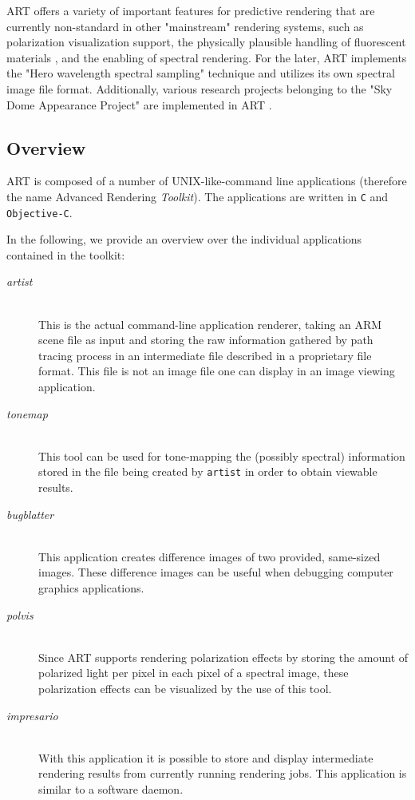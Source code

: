 ART offers a variety of important features for predictive rendering that are currently non-standard in other "mainstream" rendering systems, such as polarization visualization support, the physically plausible handling of fluorescent materials \cite{mojzik2018handling}, and the enabling of spectral rendering. For the later, ART implements the "Hero wavelength spectral sampling" technique \cite{wilkie2014hero} and utilizes its own spectral image file format. Additionally, various research projects belonging to the "Sky Dome Appearance Project" are implemented in ART \cite{hosek2012analytic, hovsek2013adding, wilkie2013predicting}.


\subsection{Overview}
ART	is composed of a number of UNIX-like-command line applications (therefore the name Advanced Rendering \emph{Toolkit}). The applications are written in \texttt{C} and \texttt{Objective-C}. 

In the following, we provide an overview over the individual applications contained in the toolkit:
\begin{description}
	\item[\emph{artist}] \hfil \\ This is the actual command-line application renderer, taking an ARM scene file as input and storing the raw information gathered by path tracing process in an intermediate file described in a proprietary file format. This file is not an image file one can display in an image viewing application.
	\item[\emph{tonemap}] \hfil \\ This tool can be used for tone-mapping the (possibly spectral) information stored in the file being created by \texttt{artist} in order to obtain viewable results.
	\item[\emph{bugblatter}] \hfil \\ This application creates difference images of two provided, same-sized images. These difference images can be useful when debugging computer graphics applications.
	\item[\emph{polvis}] \hfil \\ Since ART supports rendering polarization effects by storing the amount of polarized light per pixel in each pixel of a spectral image, these polarization effects can be visualized by the use of this tool.
	\item[\emph{impresario}] \hfil \\ With this application it is possible to store and display intermediate rendering results from currently running rendering jobs. This application is similar to a software daemon.
\end{description}

